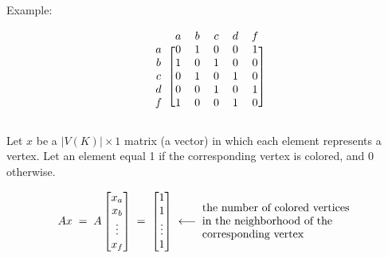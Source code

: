 \documentclass[11pt]{article}
\begin{document}
Example:\quad
\begin{minipage}{0.36\textwidth}
\centering
{}
\end{minipage}
\begin{minipage}{0.5\textwidth}
\[
  \begin{blockarray}{cccccc}
      & a & b & c & d & f \\
    \begin{block}{c[ccccc]}
      a & 0 & 1 & 0 & 0 & 1 \\
      b & 1 & 0 & 1 & 0 & 0 \\
      c & 0 & 1 & 0 & 1 & 0 \\
      d & 0 & 0 & 1 & 0 & 1 \\
      f & 1 & 0 & 0 & 1 & 0 \\
    \end{block}
  \end{blockarray}
\]
\end{minipage}

Let $x$ be a $|V(K)| \times 1$ matrix (a vector) in which each element
represents a vertex. Let an element equal 1 if the corresponding vertex is
colored, and 0 otherwise.

\[
  Ax \;=\; A
  \begin{bmatrix} x_a \\ x_b \\ \vdots \\ x_f \end{bmatrix}
  \;=\;
  \begin{bmatrix} 1 \\ 1 \\ \vdots \\ 1 \end{bmatrix}
  \;\longleftarrow\;
  \parbox{0.4\textwidth}{\raggedright the number of colored vertices in the
  neighborhood of the corresponding vertex}
\]
\end{document}
